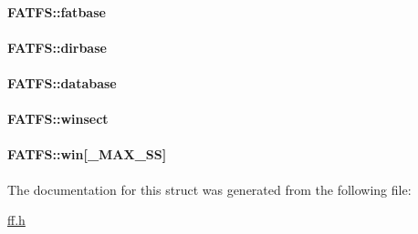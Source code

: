 \paragraph[{fatbase}]{ F\+A\+T\+F\+S\+::fatbase}\label{struct_f_a_t_f_s_a848fba02c4aabe02ef2984e578f33d64}
\paragraph[{dirbase}]{ F\+A\+T\+F\+S\+::dirbase}\label{struct_f_a_t_f_s_a3f72fd998dbcce4652a85a81fe944bc4}
\paragraph[{database}]{ F\+A\+T\+F\+S\+::database}\label{struct_f_a_t_f_s_a5b6c0bc2e9fd2ae8ef714210a74a2d5d}
\paragraph[{winsect}]{ F\+A\+T\+F\+S\+::winsect}\label{struct_f_a_t_f_s_ac60e69c00e6bf7c25febfbac4dc1476b}
\paragraph[{win}]{ F\+A\+T\+F\+S\+::win\mbox{[}{\bf \+\_\+\+M\+A\+X\+\_\+\+S\+S}\mbox{]}}\label{struct_f_a_t_f_s_a7cc35a593465e727ab87723c14610644}


The documentation for this struct was generated from the following file\+:\begin{DoxyCompactItemize}
\item 
\hyperlink{ff_8h}{ff.\+h}\end{DoxyCompactItemize}
